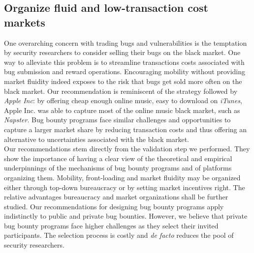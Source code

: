 \subsection{Organize fluid and low-transaction cost markets}
One overarching concern with trading bugs and vulnerabilities is the temptation by security researchers to consider selling their bugs on the black market. One way to alleviate this problem is to streamline transactions costs associated with bug submission and reward operations. Encouraging mobility without providing market fluidity indeed exposes to the risk that bugs get sold more often on the black market. Our recommendation is reminiscent of the strategy followed by {\it Apple Inc}: by offering cheap enough online music, easy to download on {\it iTunes}, Apple Inc. was able to capture most of the online music black market, such as {\it Napster}. Bug bounty programs face similar challenges and opportunities to capture a larger market share by reducing transaction costs and thus offering an alternative to uncertainties associated with the black market.\\


Our recommendations stem directly from the validation step we performed. They show the importance of having a clear view of the theoretical and empirical underpinnings of the mechanisms of bug bounty programs and of platforms organizing them. Mobility, front-loading and market fluidity may be organized either through top-down bureaucracy or by setting market incentives right. The relative advantages bureaucracy and market organizations shall be further studied. Our recommendations for designing bug bounty programs apply indistinctly to public and private bug bounties. However, we believe that private bug bounty programs face higher challenges as they select their invited participants. The selection process is costly and {\it de facto} reduces the pool of security researchers.\\



